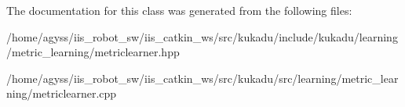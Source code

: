 The documentation for this class was generated from the following files\+:\begin{DoxyCompactItemize}
\item 
/home/agyss/iis\+\_\+robot\+\_\+sw/iis\+\_\+catkin\+\_\+ws/src/kukadu/include/kukadu/learning/metric\+\_\+learning/metriclearner.\+hpp\item 
/home/agyss/iis\+\_\+robot\+\_\+sw/iis\+\_\+catkin\+\_\+ws/src/kukadu/src/learning/metric\+\_\+learning/metriclearner.\+cpp\end{DoxyCompactItemize}
